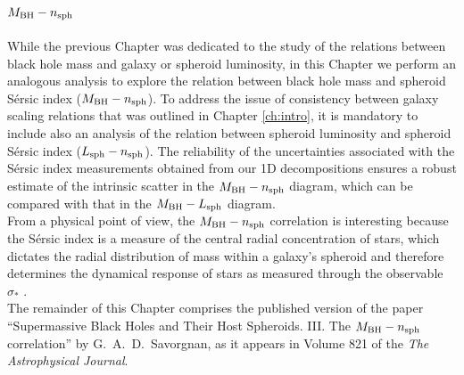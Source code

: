 \chapter{$M_{\rm BH} - n_{\rm sph}$}
\label{ch:mn}

While the previous Chapter was dedicated to the study of the relations between 
black hole mass and galaxy or spheroid luminosity, 
in this Chapter we perform an analogous analysis 
to explore the relation between black hole mass and spheroid S\'ersic index ($M_{\rm BH} - n_{\rm sph}$). 
To address the issue of consistency between galaxy scaling relations 
that was outlined in Chapter \ref{ch:intro}, 
it is mandatory to include also an analysis of the relation between spheroid luminosity 
and spheroid S\'ersic index ($L_{\rm sph} - n_{\rm sph}$). 
The reliability of the uncertainties associated with the S\'ersic index measurements 
obtained from our 1D decompositions 
ensures a robust estimate of the intrinsic scatter in the $M_{\rm BH} - n_{\rm sph}$ diagram, 
which can be compared with that in the $M_{\rm BH} - L_{\rm sph}$ diagram. \\ 

From a physical point of view, the $M_{\rm BH} - n_{\rm sph}$ correlation is interesting because 
the S\'ersic index is a measure of the central radial concentration of stars, 
which dictates the radial distribution of mass within a galaxy's spheroid 
and therefore determines the dynamical response of stars 
as measured through the observable $\sigma_*$ \citep{grahamdriver2007}. \\

The remainder of this Chapter comprises the published version of the paper 
``Supermassive Black Holes and Their Host Spheroids. 
III. The $M_{\rm BH} - n_{\rm sph}$ correlation'' 
by G.~A.~D.~Savorgnan,  
as it appears in Volume 821 of the \emph{The Astrophysical Journal}. 




